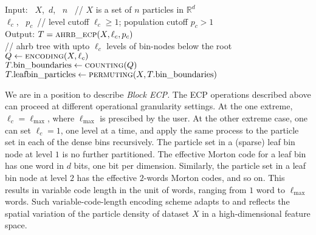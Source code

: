 \documentclass[final]{juliacon}
\begin{document}
\begin{algorithm}[h] 
  \caption{\small%
    {\sc ahrb\_ecp}
    \\ \phantom{make space}
    (the basic ECP module for {\sc ahrb} construction) }
  \label{alg:basic-ECP} 
  \small
  \SetAlgoLined
  {\rm Input:\ }
  $X$,\, $d$, \,  $n$   
   \, \phantom{x}
  // {\footnotesize $X$ is a set of $n$ particles in $\mathbb{R}^d$} 
  \\
  \phantom{Input:\ }
  $\ell_c$, \, $p_c$\,
  \phantom{xxx}
  // {\footnotesize level cutoff $\ell_c\geq 1$;
                    population cutoff $p_c >1$ } 
  \\
 {\rm Output:}\phantom{xx}
  $ T = \mbox{\sc ahrb\_ecp}(X,\ell_c, p_c)$
  \\ \phantom{xxx}
  // {\footnotesize {\sc ahrb} tree with upto $\ell_c$ levels of bin-nodes
    below the root} 
  \\
  $Q  \gets \mbox{\sc encoding}(X,\ell_c)$ 
  \\
  $T.\mbox{\rm bin\textunderscore{}boundaries} \gets \mbox{\sc counting}(Q)$ 
  \\ 
  $ T.\mbox{\rm leafbin\textunderscore{}particles}
  \gets \mbox{\sc permuting}(X,T.\mbox{\rm bin\textunderscore{}boundaries}) $
%
%
\end{algorithm}
 
%
%
%
%
%
%
%


\vspace{2pt}
%
We are in a position to describe {\em Block ECP.} The ECP operations
described above can proceed at different operational granularity settings. At
the one extreme, $\ell_c=\ell_{\max}$, where $\ell_{\max}$ is
prescibed by the user. At the other extreme case, one can set $\ell_c
=1$, one level at a time, and apply the same process to the particle
set in each of the dense bins recursively.  The particle set in a
(sparse) leaf bin node at level $1$ is no further partitioned. The
effective Morton code for a leaf bin has one word in $d$ bits, one
bit per dimension. Similarly, the particle set in a leaf bin node at
level $2$ has the effective $2$-words Morton codes, and so on.  This
results in variable code length in the unit of words, ranging from $1$
word to $\ell_{\max}$ words. Such variable-code-length encoding scheme
adapts to and reflects the spatial variation of the particle density
of dataset $X$ in a high-dimensional feature space.
%
\end{document}
